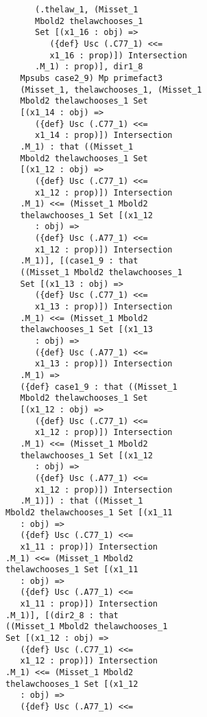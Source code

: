 \documentclass[12pt]{article}
\begin{document}
\begin{verbatim}
                   (.thelaw_1, (Misset_1 
                   Mbold2 thelawchooses_1 
                   Set [(x1_16 : obj) => 
                      ({def} Usc (.C77_1) <<= 
                      x1_16 : prop)]) Intersection 
                   .M_1) : prop)], dir1_8 
                Mpsubs case2_9) Mp primefact3 
                (Misset_1, thelawchooses_1, (Misset_1 
                Mbold2 thelawchooses_1 Set 
                [(x1_14 : obj) => 
                   ({def} Usc (.C77_1) <<= 
                   x1_14 : prop)]) Intersection 
                .M_1) : that ((Misset_1 
                Mbold2 thelawchooses_1 Set 
                [(x1_12 : obj) => 
                   ({def} Usc (.C77_1) <<= 
                   x1_12 : prop)]) Intersection 
                .M_1) <<= (Misset_1 Mbold2 
                thelawchooses_1 Set [(x1_12 
                   : obj) => 
                   ({def} Usc (.A77_1) <<= 
                   x1_12 : prop)]) Intersection 
                .M_1)], [(case1_9 : that 
                ((Misset_1 Mbold2 thelawchooses_1 
                Set [(x1_13 : obj) => 
                   ({def} Usc (.C77_1) <<= 
                   x1_13 : prop)]) Intersection 
                .M_1) <<= (Misset_1 Mbold2 
                thelawchooses_1 Set [(x1_13 
                   : obj) => 
                   ({def} Usc (.A77_1) <<= 
                   x1_13 : prop)]) Intersection 
                .M_1) => 
                ({def} case1_9 : that ((Misset_1 
                Mbold2 thelawchooses_1 Set 
                [(x1_12 : obj) => 
                   ({def} Usc (.C77_1) <<= 
                   x1_12 : prop)]) Intersection 
                .M_1) <<= (Misset_1 Mbold2 
                thelawchooses_1 Set [(x1_12 
                   : obj) => 
                   ({def} Usc (.A77_1) <<= 
                   x1_12 : prop)]) Intersection 
                .M_1)]) : that ((Misset_1 
             Mbold2 thelawchooses_1 Set [(x1_11 
                : obj) => 
                ({def} Usc (.C77_1) <<= 
                x1_11 : prop)]) Intersection 
             .M_1) <<= (Misset_1 Mbold2 
             thelawchooses_1 Set [(x1_11 
                : obj) => 
                ({def} Usc (.A77_1) <<= 
                x1_11 : prop)]) Intersection 
             .M_1)], [(dir2_8 : that 
             ((Misset_1 Mbold2 thelawchooses_1 
             Set [(x1_12 : obj) => 
                ({def} Usc (.C77_1) <<= 
                x1_12 : prop)]) Intersection 
             .M_1) <<= (Misset_1 Mbold2 
             thelawchooses_1 Set [(x1_12 
                : obj) => 
                ({def} Usc (.A77_1) <<= 

\end{verbatim}
\end{document}
